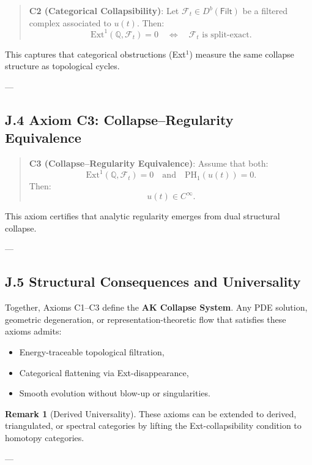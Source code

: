 \documentclass[11pt]{article}
\theoremstyle{definition}
\newtheorem{remark}[theorem]{Remark}
\begin{document}
\begin{quote}
\textbf{C2 (Categorical Collapsibility)}:  
Let \( \mathcal{F}_t \in D^b(\mathsf{Filt}) \) be a filtered complex associated to \( u(t) \).  
Then:
\[
\mathrm{Ext}^1(\mathbb{Q}, \mathcal{F}_t) = 0 \quad \Longleftrightarrow \quad \mathcal{F}_t \text{ is split-exact}.
\]
\end{quote}

This captures that categorical obstructions (Ext$^1$) measure the same collapse structure as topological cycles.

---

\subsection*{J.4 Axiom C3: Collapse–Regularity Equivalence}

\begin{quote}
\textbf{C3 (Collapse–Regularity Equivalence)}:  
Assume that both:
\[
\mathrm{Ext}^1(\mathbb{Q}, \mathcal{F}_t) = 0 \quad \text{and} \quad \mathrm{PH}_1(u(t)) = 0.
\]
Then:
\[
u(t) \in C^\infty.
\]
\end{quote}

This axiom certifies that analytic regularity emerges from dual structural collapse.

---

\subsection*{J.5 Structural Consequences and Universality}

Together, Axioms C1–C3 define the \textbf{AK Collapse System}.  
Any PDE solution, geometric degeneration, or representation-theoretic flow that satisfies these axioms admits:
\begin{itemize}
  \item Energy-traceable topological filtration,
  \item Categorical flattening via Ext-disappearance,
  \item Smooth evolution without blow-up or singularities.
\end{itemize}

\begin{remark}[Derived Universality]
These axioms can be extended to derived, triangulated, or spectral categories by lifting the Ext-collapsibility condition to homotopy categories.
\end{remark}

---
\end{document}
